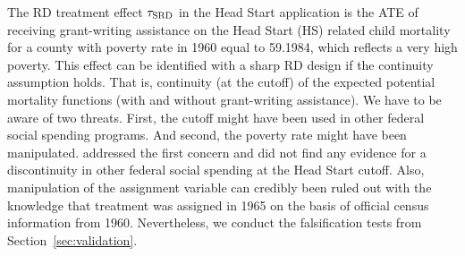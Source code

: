 The RD treatment effect $\tau_{\textup{SRD}}$ in the Head Start application is the ATE of receiving grant-writing assistance
on the Head Start (HS) related child mortality for a county with poverty rate in 1960 equal to 59.1984,
which reflects a very high poverty.
This effect can be identified with a sharp RD design if the continuity assumption holds.
That is, continuity (at the cutoff) of the expected potential mortality functions (with and without grant-writing assistance).
We have to be aware of two threats.
First, the cutoff might have been used in other federal social spending programs.
And second, the poverty rate might have been manipulated.
\citeauthor{Ludwig_2007} addressed the first concern and did not find any evidence for a discontinuity in other federal social spending at the Head Start cutoff.
Also, manipulation of the assignment variable can credibly been ruled out with the knowledge
that treatment was assigned in 1965 on the basis of official census information from 1960.
Nevertheless, we conduct the falsification tests from Section~\ref{sec:validation}.

